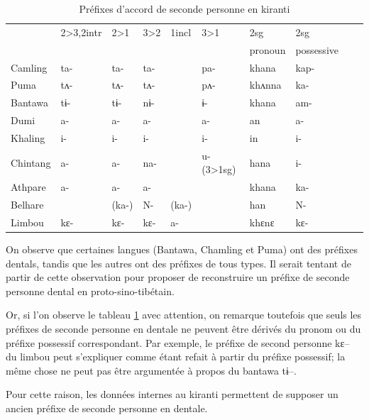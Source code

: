 \documentclass[oldfontcommands,oneside,a4paper,11pt]{memoir}
\begin{document}
 
\begin{table}[H]
\caption{Préfixes d'accord de seconde personne en kiranti}\label{tab:prefixes.kiranti}
\begin{tabular}{llllllllll} 
\toprule
    &	2>3,2intr   &	2>1   &	3>2   &	1incl   &	3>1   &	2sg   &	2sg   \\
&	  &	   &  &	  &   &	pronoun   &	possessive  \\
\midrule
Camling   &	ta-   &	ta-   &	ta-   &	    &	pa-   &	khana   &	kap-   \\
Puma   &	tʌ-   &	tʌ-   &	tʌ-   &	    &	pʌ-   &	khʌnna   &	ka-   \\
Bantawa   &	tɨ-   &	tɨ-   &	nɨ-   &	    &	ɨ-   &	khana   &	am-   \\
\midrule
Dumi   &	a-   &	a-   &	a-   &	             &	a-   &	an   &	a-   \\
Khaling   &	i-   &	i-   &	i-   &	    &	i-   &	in   &	i-   \\
Chintang   &	a-   &	a-   &	na-   &	    &	u- (3>1sg)   &	hana   &	i-   \\
Athpare   &	a-   &	a-   &	a-   &	    &	    &	khana   &	ka-   \\
Belhare   &	    &	(ka-)  &	N-   &	(ka-)   &	   &	han   &	N-   \\
Limbou   &	kɛ-   &	kɛ-   &	kɛ-   &	a-   &	    &	khɛnɛ   &	kɛ-   \\
\bottomrule
\end{tabular}
\end{table}
On observe que certaines langues (Bantawa, Chamling et Puma) ont des préfixes dentals, tandis que les autres ont des préfixes de tous types. Il serait tentant de partir de cette observation pour proposer de reconstruire un préfixe de seconde personne dental en proto-sino-tibétain. 

Or, si l'on observe le tableau \ref{tab:prefixes.kiranti} avec attention, on remarque toutefois que seuls les préfixes de seconde personne en dentale ne peuvent  être dérivés du pronom ou du préfixe possessif correspondant. Par exemple, le préfixe de second personne kɛ-- du limbou peut s'expliquer comme étant refait à partir du préfixe possessif; la même chose ne peut pas être argumentée à propos du bantawa tɨ--.

Pour cette raison, les données internes au kiranti permettent de supposer un ancien préfixe de seconde personne en dentale.
\end{document}
